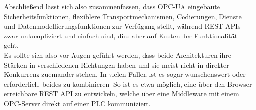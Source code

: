 Abschließend lässt sich also zusammenfassen, dass OPC-UA eingebaute Sicherheitsfunktionen, flexiblere Transportmechanismen, Codierungen, Dienste und Datenmodellierungsfunktionen zur Verfügung stellt, während REST APIs zwar unkompliziert und einfach sind, dies aber auf Kosten der Funktionalität geht.\\
Es sollte sich also vor Augen geführt werden, dass beide Architekturen ihre Stärken in verschiedenen Richtungen haben und sie meist nicht in direkter Konkurrenz zueinander stehen. In vielen Fällen ist es sogar wünschenswert oder erforderlich, beides zu kombinieren. So ist es etwa möglich, eine über den Browser erreichbare REST API zu entwickeln, welche über eine Middleware mit einem OPC-Server direkt auf einer PLC kommuniziert.
